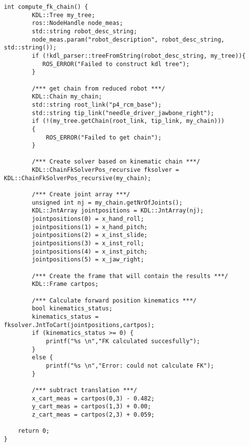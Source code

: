 \begin{lstlisting}[language=gedit]
int compute_fk_chain() {
        KDL::Tree my_tree;
        ros::NodeHandle node_meas;
        std::string robot_desc_string;
        node_meas.param("robot_description", robot_desc_string, std::string());
        if (!kdl_parser::treeFromString(robot_desc_string, my_tree)){
           ROS_ERROR("Failed to construct kdl tree");
        }
   
        /*** get chain from reduced robot ***/ 
        KDL::Chain my_chain;
        std::string root_link("p4_rcm_base");
        std::string tip_link("needle_driver_jawbone_right");
        if (!(my_tree.getChain(root_link, tip_link, my_chain)))
        {
            ROS_ERROR("Failed to get chain");
        }
    
        /*** Create solver based on kinematic chain ***/
        KDL::ChainFkSolverPos_recursive fksolver = KDL::ChainFkSolverPos_recursive(my_chain);
    
        /*** Create joint array ***/
        unsigned int nj = my_chain.getNrOfJoints();
        KDL::JntArray jointpositions = KDL::JntArray(nj);    
        jointpositions(0) = x_hand_roll;
        jointpositions(1) = x_hand_pitch;
        jointpositions(2) = x_inst_slide;
        jointpositions(3) = x_inst_roll;
        jointpositions(4) = x_inst_pitch;
        jointpositions(5) = x_jaw_right;

        /*** Create the frame that will contain the results ***/
        KDL::Frame cartpos;
    
        /*** Calculate forward position kinematics ***/
        bool kinematics_status;
        kinematics_status = fksolver.JntToCart(jointpositions,cartpos);
        if (kinematics_status >= 0) {
            printf("%s \n","FK calculated succesfully");
        } 
        else {
            printf("%s \n","Error: could not calculate FK");
        }

        /*** subtract translation ***/
        x_cart_meas = cartpos(0,3) - 0.482; 
        y_cart_meas = cartpos(1,3) + 0.00; 
        z_cart_meas = cartpos(2,3) + 0.059; 
        
    return 0;
}


\end{lstlisting}
